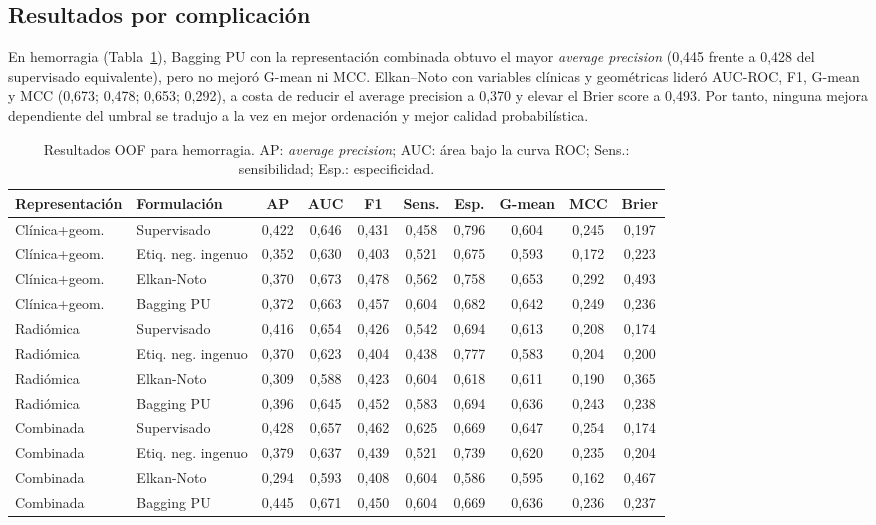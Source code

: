 \subsection{Resultados por complicación}

En hemorragia (Tabla~\ref{tab:pu_resultados_hemorragia}), Bagging PU con la representación combinada obtuvo el mayor \textit{average precision} (0,445 frente a 0,428 del supervisado equivalente), pero no mejoró G-mean ni MCC. Elkan–Noto con variables clínicas y geométricas lideró AUC-ROC, F1, G-mean y MCC (0,673; 0,478; 0,653; 0,292), a costa de reducir el average precision a 0,370 y elevar el Brier score a 0,493. Por tanto, ninguna mejora dependiente del umbral se tradujo a la vez en mejor ordenación y mejor calidad probabilística.

\begin{table}[!htbp]
\centering
\caption{Resultados OOF para hemorragia. AP: \textit{average precision}; AUC: área bajo la curva ROC; Sens.: sensibilidad; Esp.: especificidad.}
\label{tab:pu_resultados_hemorragia}
\scriptsize
\begin{adjustbox}{max width=\textwidth}
\begin{tabular}{llcccccccc}
\toprule
\textbf{Representación} & \textbf{Formulación} & \textbf{AP} & \textbf{AUC} & \textbf{F1} & \textbf{Sens.} & \textbf{Esp.} & \textbf{G-mean} & \textbf{MCC} & \textbf{Brier} \\
\midrule
Clínica+geom. & Supervisado & 0,422 & 0,646 & 0,431 & 0,458 & 0,796 & 0,604 & 0,245 & 0,197 \\
Clínica+geom. & Etiq. neg. ingenuo & 0,352 & 0,630 & 0,403 & 0,521 & 0,675 & 0,593 & 0,172 & 0,223 \\
Clínica+geom. & Elkan-Noto & 0,370 & 0,673 & 0,478 & 0,562 & 0,758 & 0,653 & 0,292 & 0,493 \\
Clínica+geom. & Bagging PU & 0,372 & 0,663 & 0,457 & 0,604 & 0,682 & 0,642 & 0,249 & 0,236 \\
\midrule
Radiómica & Supervisado & 0,416 & 0,654 & 0,426 & 0,542 & 0,694 & 0,613 & 0,208 & 0,174 \\
Radiómica & Etiq. neg. ingenuo & 0,370 & 0,623 & 0,404 & 0,438 & 0,777 & 0,583 & 0,204 & 0,200 \\
Radiómica & Elkan-Noto & 0,309 & 0,588 & 0,423 & 0,604 & 0,618 & 0,611 & 0,190 & 0,365 \\
Radiómica & Bagging PU & 0,396 & 0,645 & 0,452 & 0,583 & 0,694 & 0,636 & 0,243 & 0,238 \\
\midrule
Combinada & Supervisado & 0,428 & 0,657 & 0,462 & 0,625 & 0,669 & 0,647 & 0,254 & 0,174 \\
Combinada & Etiq. neg. ingenuo & 0,379 & 0,637 & 0,439 & 0,521 & 0,739 & 0,620 & 0,235 & 0,204 \\
Combinada & Elkan-Noto & 0,294 & 0,593 & 0,408 & 0,604 & 0,586 & 0,595 & 0,162 & 0,467 \\
Combinada & Bagging PU & 0,445 & 0,671 & 0,450 & 0,604 & 0,669 & 0,636 & 0,236 & 0,237 \\
\bottomrule
\end{tabular}
\end{adjustbox}
\end{table}

